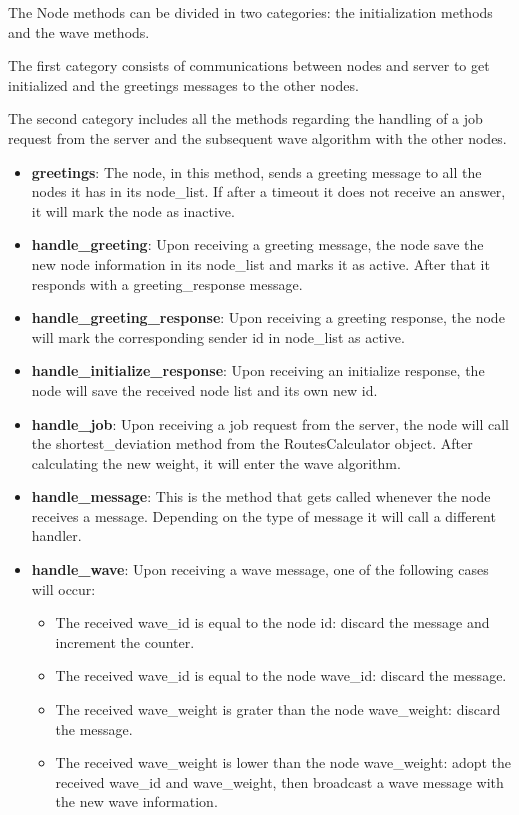 \documentclass[titlepage]{article}
\begin{document}
The Node methods can be divided in two categories: the initialization methods and the wave methods.

The first category consists of communications between nodes and server to get initialized and the greetings messages to the other nodes.

The second category includes all the methods regarding the handling of a job request from the server and the subsequent wave algorithm with the other nodes.

\begin{itemize}
    \item \textbf{greetings}: The node, in this method, sends a greeting message to all the nodes it has in its node\_list. If after a timeout it does not receive an answer, it will mark the node as inactive.
    \item \textbf{handle\_greeting}: Upon receiving a greeting message, the node save the new node information in its node\_list and marks it as active. After that it responds with a greeting\_response message.
    \item \textbf{handle\_greeting\_response}: Upon receiving a greeting response, the node will mark the corresponding sender id in node\_list as active.
    \item \textbf{handle\_initialize\_response}: Upon receiving an initialize response, the node will save the received node list and its own new id.
    \item \textbf{handle\_job}: Upon receiving a job request from the server, the node will call the shortest\_deviation method from the RoutesCalculator object. After calculating the new weight, it will enter the wave algorithm.
    \item \textbf{handle\_message}: This is the method that gets called whenever the node receives a message. Depending on the type of message it will call a different handler.
    \item \textbf{handle\_wave}: Upon receiving a wave message, one of the following cases will occur:
    \begin{itemize}
        \item The received wave\_id is equal to the node id: discard the message and increment the counter.
        \item The received wave\_id is equal to the node wave\_id: discard the message.
        \item The received wave\_weight is grater than the node wave\_weight: discard the message.
        \item The received wave\_weight is lower than the node wave\_weight: adopt the received wave\_id and wave\_weight, then broadcast a wave message with the new wave information.

\end{itemize}
\end{itemize}
\end{document}
